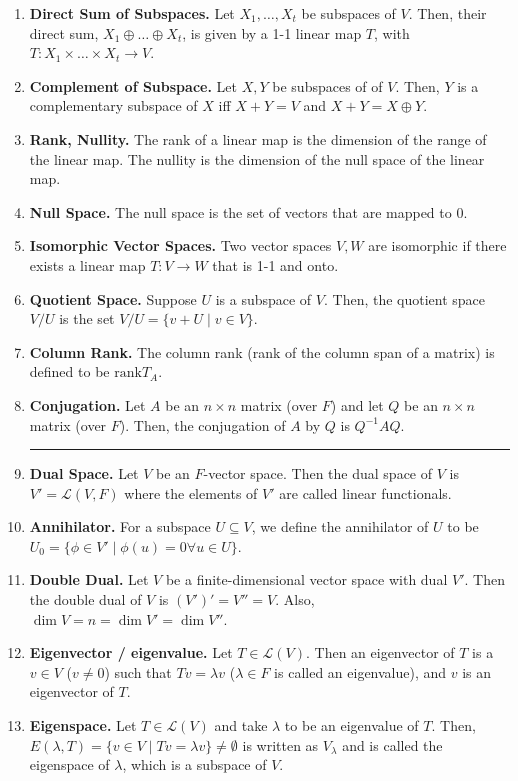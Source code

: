 \begin{enumerate}
    \item \textbf{Direct Sum of Subspaces. } Let $X_1,\dots,X_t$ be subspaces of $V$. Then, their direct sum, $X_1 \oplus \dots \oplus X_t$, is given by a 1-1 linear map $T$, with $T: X_1\times \dots \times X_t \to V$.
	\item \textbf{Complement of Subspace. } Let $X,Y$ be subspaces of of $V$. Then, $Y$ is a complementary subspace of $X$ iff $X+Y=V$ and $X+Y = X \oplus Y$. 
	\item \textbf{Rank, Nullity. } The rank of a linear map is the dimension of the range of the linear map. The nullity is the dimension of the null space of the linear map. 
	\item \textbf{Null Space. } The null space is the set of vectors that are mapped to $0$. 
	\item \textbf{Isomorphic Vector Spaces. } Two vector spaces $V, W$ are isomorphic if there exists a linear map $T: V \to W$ that is 1-1 and onto. 
	\item \textbf{Quotient Space. } Suppose $U$ is a subspace of $V$. Then, the quotient space $V / U$ is the set $V / U = \{v + U \mid v \in V\}$. 
	\item \textbf{Column Rank. } The column rank (rank of the column span of a matrix) is defined to be $\textrm{rank}T_A$. 
	\item \textbf{Conjugation. } Let $A$ be an $n \times n$ matrix (over $F$) and let $Q$ be an $n \times n$ matrix (over $F$). Then, the conjugation of $A$ by $Q$ is $Q^{-1}AQ$.
	\begin{center}
		\hrule
	\end{center} 
	\item \textbf{Dual Space. } Let $V$ be an $F$-vector space. Then the dual space of $V$ is $V' = \mathscr{L}(V,F)$ where the elements of $V'$ are called linear functionals. 
	\item \textbf{Annihilator. } For a subspace $U \subseteq V$, we define the annihilator of $U$ to be $U_0 = \{\phi \in V' \mid \phi(u) = 0 \forall u \in U\}$. 
	\item \textbf{Double Dual. } Let $V$ be a finite-dimensional vector space with dual $V'$. Then the double dual of $V$ is $(V')' = V'' = V$. Also, $\dim V = n = \dim V' = \dim V''$. 
	\item \textbf{Eigenvector / eigenvalue. } Let $T \in \mathscr{L}(V)$. Then an eigenvector of $T$ is a $v \in V$ ($v \neq 0$) such that $Tv = \lambda v$ ($\lambda \in F$ is called an eigenvalue), and $v$ is an eigenvector of $T$. 
	\item \textbf{Eigenspace. } Let $T \in \mathscr{L}(V)$ and take $\lambda$ to be an eigenvalue of $T$. Then, $E(\lambda,T) = \{v \in V \mid Tv = \lambda v\} \neq \emptyset$ is written as $V_\lambda$ and is called the eigenspace of $\lambda$, which is a subspace of $V$. 

\end{enumerate}
